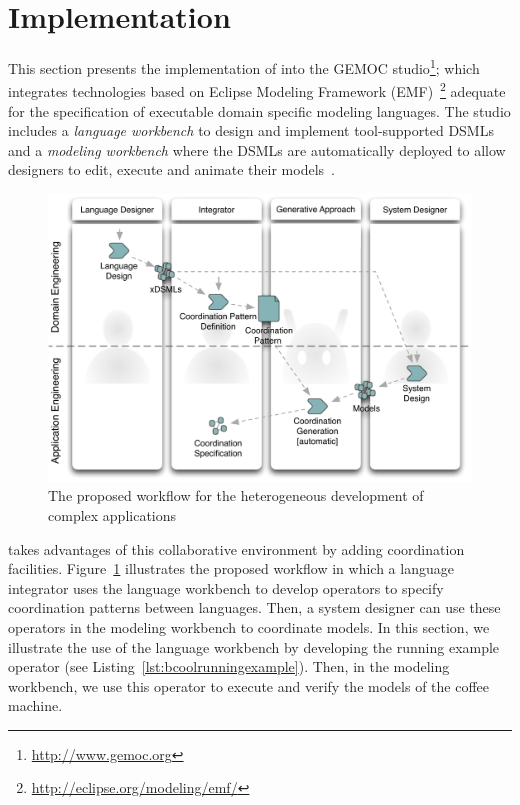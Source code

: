 \section{Implementation}
\label{section:bcoollengbench}
This section presents the implementation of \bcool into the GEMOC studio\footnote{\url{http://www.gemoc.org}}; which integrates technologies based on Eclipse Modeling Framework (EMF)~\footnote{\url{http://eclipse.org/modeling/emf/}} adequate for the specification of executable domain specific modeling languages. The studio includes a \emph{language workbench} to design and implement tool-supported DSMLs and a \emph{modeling workbench} where the DSMLs are automatically deployed to allow designers to edit, execute and animate their models~\cite{ttc15bib}.

\begin{figure}
	\begin{center}
		\includegraphics[width=.6\textwidth]{bcool/figs/process}
		\caption{The proposed workflow for the heterogeneous development of complex applications}
		\label{fig:proposedworkflow}
	\end{center}
\end{figure}

\bcool takes advantages of this collaborative environment by adding coordination facilities. Figure~\ref{fig:proposedworkflow} illustrates the proposed workflow in which a language integrator uses the language workbench to develop \bcool operators to specify coordination patterns between languages. Then, a system designer can use these operators in the modeling workbench to coordinate models. In this section, we illustrate the use of the language workbench by developing the running example operator (see Listing~\ref{lst:bcoolrunningexample}). Then, in the modeling workbench, we use this operator to execute and verify the models of the coffee machine. 

